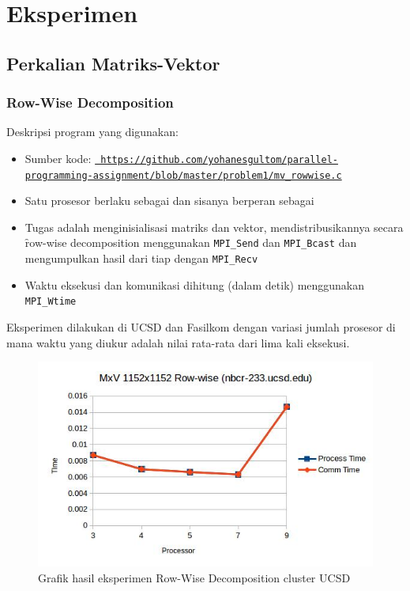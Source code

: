 \section{Eksperimen}

\subsection{Perkalian Matriks-Vektor} 

\subsubsection{Row-Wise Decomposition}

Deskripsi program yang digunakan:
\begin{itemize}
	\item Sumber kode: \texttt{\url{ https://github.com/yohanesgultom/parallel-programming-assignment/blob/master/problem1/mv_rowwise.c}}
	\item Satu prosesor berlaku sebagai \manager dan sisanya berperan sebagai \worker 
	\item Tugas \manager adalah menginisialisasi matriks dan vektor, mendistribusikannya secara \f{row-wise decomposition} menggunakan \verb|MPI_Send| dan \verb|MPI_Bcast| dan mengumpulkan hasil dari tiap \worker dengan \verb|MPI_Recv|	
	\item Waktu eksekusi dan komunikasi dihitung (dalam detik) menggunakan \verb|MPI_Wtime|
\end{itemize}

Eksperimen dilakukan di \cluster UCSD dan Fasilkom dengan variasi jumlah prosesor di mana waktu yang diukur adalah nilai rata-rata dari lima kali eksekusi.

\begin{figure}
	\centering
	\includegraphics[width=1\textwidth]
	{pics/chart_mv_rowwise_nbcr}
	\caption{Grafik hasil eksperimen Row-Wise Decomposition cluster UCSD}
	\label{fig:result_mv_rowwise_nbcr}
\end{figure}  


